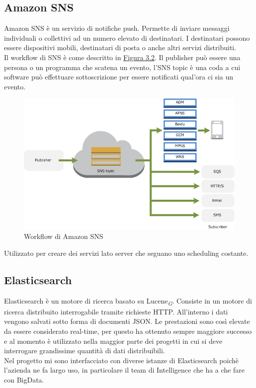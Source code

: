 \documentclass[a4paper, 12pt, twoside, openright]{book}
\newcommand{\gloss}[1]{#1\textsubscript{\textit{\tiny{G}}}}
\begin{document}
\subsection{Amazon SNS}
Amazon SNS è un servizio di notifiche push. Permette di inviare messaggi individuali o collettivi ad un numero elevato di destinatari. I destinatari possono essere dispositivi mobili, destinatari di posta o anche altri servizi distribuiti.\\
Il workflow di SNS è come descritto in \hyperref[sns-workflow]{Figura 3.2}. Il publisher può essere una persona o un programma che scatena un evento, l'SNS topic è una coda a cui software può effettuare sottoscrizione per essere notificati qual'ora ci sia un evento.
\begin{figure}[H]
	\centering
	\label{sns-workflow}
	\includegraphics[width=1.0\textwidth]{images/sns-workflow.png}
	\caption{Workflow di Amazon SNS}
\end{figure} 
Utilizzato per creare dei servizi lato server che seguano uno scheduling costante.\\
\subsection{Elasticsearch}
Elasticsearch è un motore di ricerca basato su \gloss{Lucene}. Consiste in un motore di ricerca distribuito interrogabile tramite richieste HTTP. All'interno i dati vengono salvati sotto forma di documenti JSON. Le prestazioni sono così elevate da essere considerato real-time, per questo ha ottenuto sempre maggiore successo e al momento è utilizzato nella maggior parte dei progetti in cui si deve interrogare grandissime quantità di dati distribuibili.\\
Nel progetto mi sono interfacciato con diverse istanze di Elasticsearch poichè l'azienda ne fa largo uso, in particolare il team di Intelligence che ha a che fare con BigData.
\end{document}
